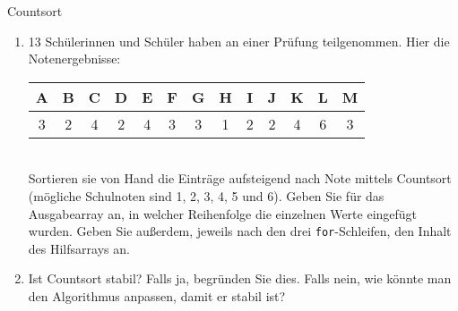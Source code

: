 \documentclass[11pt,a4paper]{article}
\begin{document}
\thispagestyle{empty}




\begin{aufgabe}{1}{Countsort}
    \begin{enumerate}
        \item
        13 Schülerinnen und Schüler haben an einer Prüfung teilgenommen.
        Hier die Notenergebnisse:
        \begin{table}[h!]
            \centering
            \begin{tabular}{|c|c|c|c|c|c|c|c|c|c|c|c|c|}
                \hline
                \textbf{A} & \textbf{B} & \textbf{C} & \textbf{D} & \textbf{E} & \textbf{F} & \textbf{G} & \textbf{H} & \textbf{I} & \textbf{J} & \textbf{K} & \textbf{L} & \textbf{M} \\
                \hline
                3 & 2 & 4 & 2 & 4 & 3 & 3 & 1 & 2 & 2 & 4 & 6 & 3 \\
                \hline
            \end{tabular}
        \end{table}
        \ \\
        Sortieren sie von Hand die Einträge aufsteigend nach Note mittels Countsort (mögliche Schulnoten sind 1, 2, 3, 4, 5 und 6).
        Geben Sie für das Ausgabearray an, in welcher Reihenfolge die einzelnen Werte eingefügt wurden.
        Geben Sie außerdem, jeweils nach den drei \texttt{for}-Schleifen, den Inhalt des Hilfsarrays an.
        \item
        Ist Countsort stabil?
        Falls ja, begründen Sie dies.
        Falls nein, wie könnte man den Algorithmus anpassen, damit er stabil ist?
    \end{enumerate}
\end{aufgabe}
\end{document}
